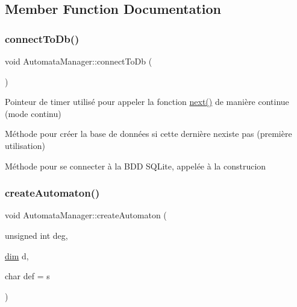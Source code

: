 \subsection{Member Function Documentation}
\mbox{\label{class_automata_manager_a14ee46a98c19260dae2d51cea466c841}} 
\subsubsection{\texorpdfstring{connect\+To\+Db()}{connectToDb()}}
{\footnotesize\ttfamily void Automata\+Manager\+::connect\+To\+Db (\begin{DoxyParamCaption}{ }\end{DoxyParamCaption})\hspace{0.3cm}{\ttfamily [private]}}



Pointeur de timer utilisé pour appeler la fonction \mbox{\hyperlink{class_automata_manager_ae7788f4fb5ae9c6f4ffaf6b471d969ad}{next()}} de manière continue (mode continu) 

Méthode pour créer la base de données si cette dernière n\textquotesingle{}existe pas (première utilisation)

Méthode pour se connecter à la B\+DD S\+Q\+Lite, appelée à la construcion \mbox{\label{class_automata_manager_a12dcc64dec9939b5decca89140c865e2}} 
\subsubsection{\texorpdfstring{create\+Automaton()}{createAutomaton()}}
{\footnotesize\ttfamily void Automata\+Manager\+::create\+Automaton (\begin{DoxyParamCaption}\item[{unsigned int}]{deg,  }\item[{\mbox{\hyperlink{automatamanager_8h_ae6fa959b9e8f9c638e0d82bf2c7dc5e7}{dim}}}]{d,  }\item[{char}]{def = {\ttfamily \textquotesingle{}s\textquotesingle{}} }\end{DoxyParamCaption})}



